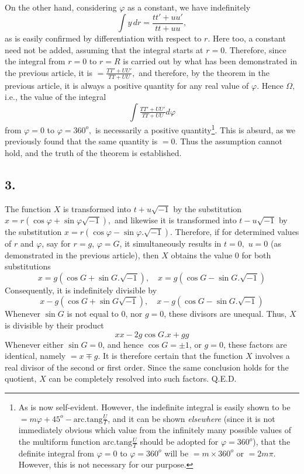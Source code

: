 \documentclass[12pt]{memoir}
\theoremstyle{plain}
\theoremstyle{remark}
\begin{document}
On the other hand, considering \(\varphi\) as a constant, we have indefinitely
\[\int y \,dr = \frac{tt'+uu'}{tt+uu},\]
as is easily confirmed by differentiation with respect to \(r\). Here too, a constant need not be added, assuming that the integral starts at \(r=0\). Therefore, since the integral from \(r=0\) to \(r=R\) is carried out by what has been demonstrated in the previous article, it is \(=\frac{TT'+UU'}{TT+UU},\) and therefore, by the theorem in the previous article, it is always a positive quantity for any real value of \(\varphi\). Hence \(\Omega,\) i.e., the value of the integral
\[\int\tfrac{TT'+UU'}{TT+UU}d\varphi\]
from \(\varphi=0\) to \(\varphi=360^o,\) is necessarily a positive quantity\footnote{As is now self-evident. However, the indefinite integral is easily shown to be \(= m\varphi+45^o-\mathrm{arc.tang}\tfrac{U}{T}\), and it can be shown \textit{elsewhere} (since it is not immediately obvious which value from the infinitely many possible values of the multiform function \(\mathrm{arc.tang}\tfrac{U}{T}\) should be adopted for \(\varphi=360^o\)), that the definite integral from \(\varphi=0\) to \(\varphi=360^o\) will be \(=m\times360^o\) or \(=2 m\pi\). However, this is not necessary for our purpose.}. This is absurd, as we previously found that the same quantity is \(=0.\) Thus the assumption cannot hold, and the truth of the theorem is established.

\subsection*{3.}

The function \(X\) is transformed into \(t+u\sqrt{-1}\) by the substitution \(x = r(\cos\varphi + \sin\varphi \sqrt{-1}),\) and likewise it is transformed into \(t-u\sqrt{-1}\) by the substitution \(x=r(\cos\varphi-\sin\varphi.\sqrt{-1}).\)  Therefore, if for determined values of \(r\) and \(\varphi\), say for \(r=g\), \(\varphi=G\), it simultaneously results in \(t=0,\) \(u=0\) (as demonstrated in the previous article), then \(X\) obtains the value \(0\) for both substitutions
\[ x=g(\cos G+\sin G.\sqrt{-1}),\quad x=g(\cos G - \sin G.\sqrt{-1})\]
Consequently, it is indefinitely divisible by
\[ x-g(\cos G+\sin G\sqrt{-1}),\quad x-g(\cos G - \sin G.\sqrt{-1})\]
Whenever \(\sin G\) is not equal to 0, nor \(g=0\), these divisors are unequal. Thus, \(X\) is divisible by their product
\[xx-2g\cos G .x+gg\]
Whenever either \(\sin G =0\), and hence \(\cos G=\pm1\), or \(g=0\), these factors are identical, namely \(=x\mp g\). It is therefore certain that the function \(X\) involves a real divisor of the second or first order. Since the same conclusion holds for the quotient, \(X\) can be completely resolved into such factors. Q.E.D.
\end{document}
